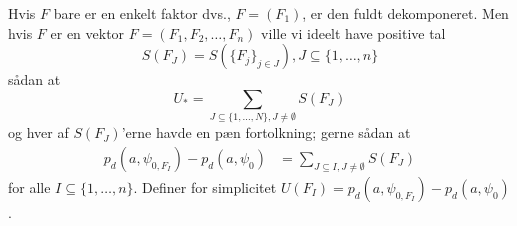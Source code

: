 \documentclass[a4paper, 12pt]{memoir}
\begin{document}
Hvis $F$ bare er en enkelt faktor dvs., $F=(F_1)$, er den fuldt dekomponeret. Men hvis $F$ er en vektor $F=(F_1, F_2, \dots, F_n)$ ville vi ideelt have positive tal 
\begin{equation*}
S(F_J)=S(\{F_j\}_{j\in J}), J\subseteq \{1, \dots, n\}
\end{equation*}
sådan at
\begin{equation}
U_*=\sum_{J\subseteq \{1, \dots, N\}, J\neq \emptyset}S(F_J)
\end{equation}
og hver af $S(F_J)$'erne havde en pæn fortolkning; gerne sådan at 
\begin{align}
p_d(a,\psi_{0,F_I})-p_d(a, \psi_0)&=\sum_{J\subseteq I, J\neq \emptyset} S(F_J)\label{decomp}
\end{align}
for alle $I\subseteq \{1, \dots, n\}$. Definer for simplicitet $U(F_I)=p_d(a,\psi_{0,F_I})-p_d(a, \psi_0)$.
%
%
%
\end{document}
